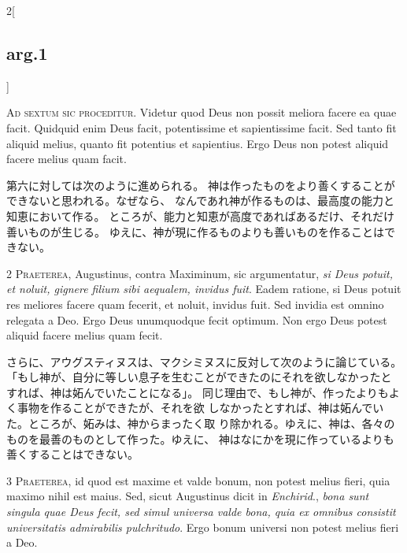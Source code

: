 \documentclass[paper=a4paper,fontsize=10pt,jafontsize=9pt,titlepage]{jlreq}
\begin{document}
\begin{paracol}{2}[\subsection{arg.1}]

{\huge A}{\scshape d sextum sic proceditur}. Videtur quod Deus
non possit meliora facere ea quae facit. Quidquid enim Deus facit,
potentissime et sapientissime facit. Sed tanto fit aliquid melius,
quanto fit potentius et sapientius. Ergo Deus non potest aliquid facere
melius quam facit.

\switchcolumn

第六に対しては次のように進められる。
神は作ったものをより善くすることができないと思われる。なぜなら、
なんであれ神が作るものは、最高度の能力と知恵において作る。
ところが、能力と知恵が高度であればあるだけ、それだけ善いものが生じる。
ゆえに、神が現に作るものよりも善いものを作ることはできない。


{\scshape 2 Praeterea}, Augustinus, contra Maximinum, sic argumentatur,
{\itshape si Deus potuit, et noluit, gignere filium sibi aequalem,
invidus fuit}. Eadem ratione, si Deus potuit res meliores facere quam
fecerit, et noluit, invidus fuit. Sed invidia est omnino relegata a
Deo. Ergo Deus unumquodque fecit optimum. Non ergo Deus potest aliquid
facere melius quam fecit.

\switchcolumn

さらに、アウグスティヌスは、マクシミヌスに反対して次のように論じている。
 「もし神が、自分に等しい息子を生むことができたのにそれを欲しなかったと
 すれば、神は妬んでいたことになる」。
同じ理由で、もし神が、作ったよりもよく事物を作ることができたが、それを欲
 しなかったとすれば、神は妬んでいた。ところが、妬みは、神からまったく取
 り除かれる。ゆえに、神は、各々のものを最善のものとして作った。ゆえに、
 神はなにかを現に作っているよりも善くすることはできない。


{\scshape 3 Praeterea}, id quod est maxime et valde bonum, non potest
melius fieri, quia maximo nihil est maius. Sed, sicut Augustinus dicit
in {\itshape Enchirid}., {\itshape bona sunt singula quae Deus fecit,
sed simul universa valde bona, quia ex omnibus consistit universitatis
admirabilis pulchritudo}. Ergo bonum universi non potest melius fieri a
Deo.


\end{paracol}
\end{document}
